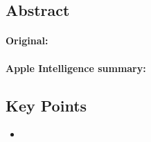 \documentclass[a4paper,12pt]{article}
\begin{document}
\subsection{Abstract}

\paragraph{Original:}

\paragraph{Apple Intelligence summary:}


\subsection{Key Points}

\begin{itemize}
    \item 
\end{itemize}


\pagebreak
\printbibliography
\end{document}
